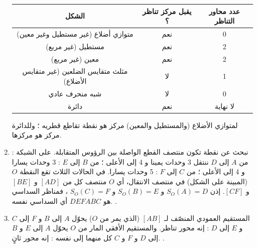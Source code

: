 \documentclass[12pt,a4paper]{article}
\begin{document}
\begin{corr}[title={مراكز التناظر ومحاوره}, stars=3, source={Axiomaths}]
\begin{enumerate}[itemsep=14pt]
\begin{center}
  \begin{tabular}{|c|c|c|}
    \hline
    الشكل & يقبل مركز تناظر ؟ & عدد محاور التناظر \\ \hline
    متوازي أضلاع (غير مستطيل وغير معين) & نعم & 0 \\ \hline
    مستطيل (غير مربع) & نعم & 2 \\ \hline
    معين (غير مربع) & نعم & 2 \\ \hline
    مثلث متقايس الضلعين (غير متقايس الأضلاع) & لا & 1 \\ \hline
    شبه منحرف عادي & لا & 0 \\ \hline
    دائرة & نعم & لا نهاية \\ \hline
  \end{tabular}
  \end{center}
  لمتوازي الأضلاع (والمستطيل والمعين) مركز هو نقطة تقاطع قطريه ؛ وللدائرة مركز هو مركزها.
  \item نبحث عن نقطة تكون منتصف القطع الواصلة بين الرؤوس المتقابلة. على الشبكة : من $A$ إلى $D$ ننتقل 3 وحدات يمينا و 4 إلى الأعلى ؛ من $B$ إلى $E$ : 3 وحدات يسارا و 4 إلى الأعلى ؛ من $C$ إلى $F$ : 5 وحدات يسارا. في الحالات الثلاث تقع النقطة $O$ (المبينة على الشكل) في منتصف الانتقال، أي $O$ منتصف كل من $[AD]$ و $[BE]$ و $[CF]$.
  إذن $S_O(A)=D$ و $S_O(B)=E$ و $S_O(C)=F$ ، فمناظر السداسي هو $DEFABC$ أي السداسي نفسه. .
  \begin{center}
  \end{center}
  \item المستقيم العمودي المنصّف لـ $[AB]$ (الذي يمر من $O$) يحوّل $A$ إلى $B$ و $F$ إلى $C$ و $E$ إلى $D$ : إنه محور تناظر. والمستقيم الأفقي المار من $O$ يحوّل $A$ إلى $E$ و $B$ إلى $D$ و $F$ و $C$ كل منهما إلى نفسه : إنه محور ثانٍ. .

\end{enumerate}
\end{corr}
\end{document}
